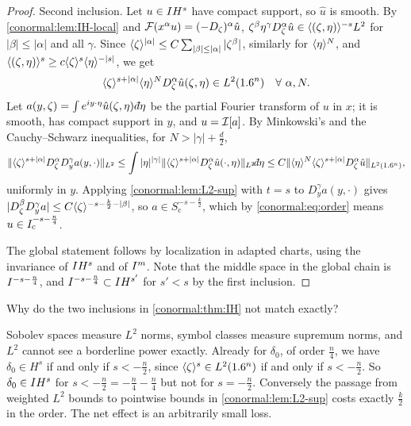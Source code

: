 \begin{proof}
  Second inclusion.  Let $u\in IH^{s}$ have compact support, so $\hat u$ is smooth.
  By \cref{conormal:lem:IH-local} and $\mathcal{F}(x^\alpha u)=(-D_\zeta)^\alpha\hat u$,
  $\zeta^\beta\eta^\gamma D_\zeta^\alpha\hat u\in\langle (\zeta,\eta)\rangle^{-s}L^2$ for
  $|\beta|\le|\alpha|$ and all $\gamma$.  Since $\langle \zeta\rangle^{|\alpha|}\le
  C\sum_{|\beta|\le|\alpha|}|\zeta^\beta|$, similarly for $\langle \eta\rangle^N$, and
  $\langle (\zeta,\eta)\rangle^{s}\ge c\langle \zeta\rangle^{s}\langle \eta\rangle^{-|s|}$, we get
  \begin{equation}\label{conormal:eq:weighted}
    \langle \zeta\rangle^{s+|\alpha|}\langle \eta\rangle^{N}D_\zeta^\alpha\hat u(\zeta,\eta)\in
    L^2(1.6^n)\quad\forall\ \alpha,N.
  \end{equation}
  Let $a(y,\zeta)=\int e^{iy\cdot\eta}\hat u(\zeta,\eta)\,\dbar\eta$ be the
  partial Fourier transform of $u$ in $x$; it is smooth, has compact support in
  $y$, and $u=\mathcal{I}[a]$.  By Minkowski's and the Cauchy--Schwarz inequalities, for
  $N>|\gamma|+\frac d2$,
  \begin{equation*}
    \norm{\ang\zeta^{s+|\alpha|}D_\zeta^\alpha D_y^\gamma a(y,\cdot)}_{L^2}\le
    \int|\eta|^{|\gamma|}\norm{\ang\zeta^{s+|\alpha|}D_\zeta^\alpha
    \hat u(\cdot,\eta)}_{L^2}\dbar\eta
    \le C\norm{\ang\eta^N\ang\zeta^{s+|\alpha|}D_\zeta^\alpha\hat u}_{L^2(\R^n)},
  \end{equation*}
  uniformly in $y$.  Applying \cref{conormal:lem:L2-sup} with $t=s$ to
  $D_y^\gamma a(y,\cdot)$ gives $|D_\zeta^\beta D_y^\gamma a|\le
  C\langle \zeta\rangle^{-s-\frac k2-|\beta|}$, so $a\in S^{-s-\frac k2}_{\mathrm c}$, which
  by \eqref{conormal:eq:order} means $u\in I^{-s-\frac n4}_{\mathrm c}$.

  The global statement follows by localization in adapted charts, using the
  invariance of $IH^{s}$ and of $I^{m}$.  Note that the middle space in the
  global chain is $I^{-s-\frac n4}$, and $I^{-s-\frac n4}\subset IH^{s'}$ for
  $s'<s$ by the first inclusion.
\end{proof}

\begin{question}
  Why do the two inclusions in \cref{conormal:thm:IH} not match exactly?
\end{question}
\begin{answer}
  Sobolev spaces measure $L^2$ norms, symbol classes measure supremum norms,
  and $L^2$ cannot see a borderline power exactly. Already for $\delta_0$, of
  order $\frac n4$, we have $\delta_0\in H^s$ if and only if $s<-\frac n2$,
  since $\langle \zeta\rangle^{s}\in L^2(1.6^n)$ if and only if $s<-\frac n2$. So
  $\delta_0\in IH^{s}$ for $s<-\frac n2=-\frac n4-\frac n4$ but not for
  $s=-\frac n2$. Conversely the passage from weighted $L^2$ bounds to
  pointwise bounds in \cref{conormal:lem:L2-sup} costs exactly $\frac k2$ in
  the order. The net effect is an arbitrarily small loss.
\end{answer}

